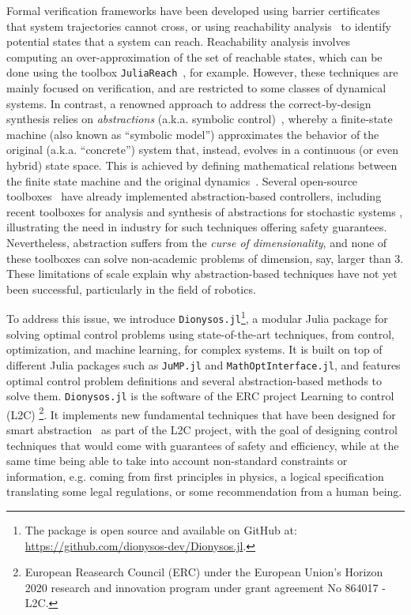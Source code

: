 \documentclass{juliacon}
\begin{document}
Formal verification frameworks have been developed using barrier certificates~\cite{prajna2006barrier,prajna2004safety} that system trajectories cannot cross, or using reachability analysis~\cite{althoff2010reachability} to identify potential states that a system can reach.
Reachability analysis involves computing an over-approximation of the set of reachable states, which can be done using the toolbox \texttt{JuliaReach}~\cite{bogomolov2019juliareach}, for example. However, these techniques are mainly focused on verification, and are restricted to some classes of dynamical systems.
%
In contrast, a renowned approach to address the correct-by-design synthesis relies on \emph{abstractions} (a.k.a. symbolic control)~\cite{tabuada2009verification}, whereby a finite-state machine (also known as ``symbolic model'') approximates the behavior of the original (a.k.a. ``concrete'') system that, instead, evolves in a continuous (or even hybrid) state space. 
This is achieved by defining mathematical relations between the finite state machine and the original dynamics~\cite{alur1998alternating,reissig2016feedback}. 
Several open-source toolboxes~\cite{mazo2010pessoa,Roy2011,rungger2016scots} have already implemented abstraction-based controllers, including recent toolboxes for analysis and synthesis of abstractions for stochastic systems \cite{Mathiesen2024,Wooding2024}, illustrating the need in industry for such techniques offering safety guarantees. Nevertheless, abstraction suffers from the \emph{curse of dimensionality}, and none of these toolboxes can solve non-academic problems of dimension, say, larger than $3$. These limitations of scale explain why abstraction-based techniques have not yet been successful, particularly in the field of robotics.

\vskip 6pt
To address this issue, we introduce \texttt{Dionysos.jl}\footnote{The package is open source and available on GitHub at: \url{https://github.com/dionysos-dev/Dionysos.jl}.}, a modular Julia \cite{bezanson2017julia} package for solving optimal control problems using state-of-the-art techniques, from control, optimization, and machine learning, for complex systems.
It is built on top of different Julia packages such as \texttt{JuMP.jl} and \texttt{MathOptInterface.jl}, and
features optimal control problem definitions and several abstraction-based methods to solve them.
\texttt{Dionysos.jl} is the software of the ERC project Learning to control (L2C)%
\footnote{European Reasearch Council (ERC) under the European Union's Horizon 2020 research and innovation program under 
 grant agreement No 864017 - L2C.}.
%
It implements new fundamental techniques 
that have been designed for smart abstraction~\cite{calbert2021alternating,legat2021abstraction,egidio2022state,banse2023data,calbert2023data} as part of the L2C project, with the goal of designing control techniques that would come with guarantees of safety and efficiency, while at the same time being able to take into account non-standard constraints or information, e.g. coming from first principles in physics, a logical specification translating some legal regulations, or some recommendation from a human being.
\end{document}

